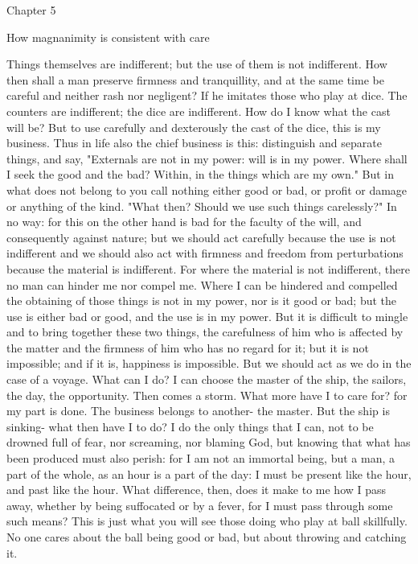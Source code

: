 \documentclass[a4paper]{article}
\begin{document}
Chapter 5

How magnanimity is consistent with care

    Things themselves are indifferent; but the use of them is not indifferent.
How then shall a man preserve firmness and tranquillity, and at the same time
be careful and neither rash nor negligent? If he imitates those who play at
dice. The counters are indifferent; the dice are indifferent. How do I know
what the cast will be? But to use carefully and dexterously the cast of the
dice, this is my business. Thus in life also the chief business is this:
distinguish and separate things, and say, "Externals are not in my power: will
is in my power. Where shall I seek the good and the bad? Within, in the things
which are my own." But in what does not belong to you call nothing either good
or bad, or profit or damage or anything of the kind.
    "What then? Should we use such things carelessly?" In no way: for this on
the other hand is bad for the faculty of the will, and consequently against
nature; but we should act carefully because the use is not indifferent and we
should also act with firmness and freedom from perturbations because the
material is indifferent. For where the material is not indifferent, there no
man can hinder me nor compel me. Where I can be hindered and compelled the
obtaining of those things is not in my power, nor is it good or bad; but the
use is either bad or good, and the use is in my power. But it is difficult to
mingle and to bring together these two things, the carefulness of him who is
affected by the matter and the firmness of him who has no regard for it; but it
is not impossible; and if it is, happiness is impossible. But we should act as
we do in the case of a voyage. What can I do? I can choose the master of the
ship, the sailors, the day, the opportunity. Then comes a storm. What more have
I to care for? for my part is done. The business belongs to another- the
master. But the ship is sinking- what then have I to do? I do the only things
that I can, not to be drowned full of fear, nor screaming, nor blaming God, but
knowing that what has been produced must also perish: for I am not an immortal
being, but a man, a part of the whole, as an hour is a part of the day: I must
be present like the hour, and past like the hour. What difference, then, does
it make to me how I pass away, whether by being suffocated or by a fever, for I
must pass through some such means?
    This is just what you will see those doing who play at ball skillfully. No
one cares about the ball being good or bad, but about throwing and catching it.
\end{document}
